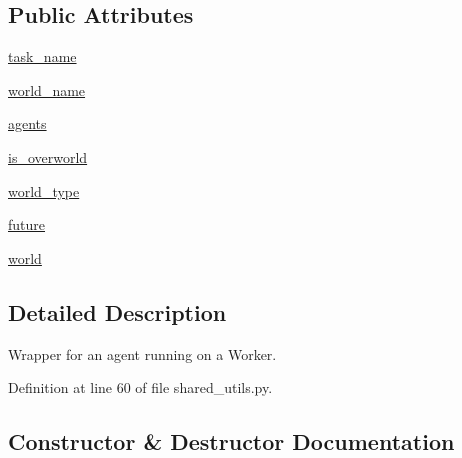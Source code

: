 \subsection*{Public Attributes}
\begin{DoxyCompactItemize}
\item 
\hyperlink{classparlai_1_1chat__service_1_1services_1_1messenger_1_1shared__utils_1_1TaskState_a34a947c51b78f84f79de8e87d8e1cf5b}{task\+\_\+name}
\item 
\hyperlink{classparlai_1_1chat__service_1_1services_1_1messenger_1_1shared__utils_1_1TaskState_a83fab38feda407c392bd8ea32eb19607}{world\+\_\+name}
\item 
\hyperlink{classparlai_1_1chat__service_1_1services_1_1messenger_1_1shared__utils_1_1TaskState_a2e39f33ab663bb7345223e90f0dd530d}{agents}
\item 
\hyperlink{classparlai_1_1chat__service_1_1services_1_1messenger_1_1shared__utils_1_1TaskState_ad19ea555a240eec41329931887b93475}{is\+\_\+overworld}
\item 
\hyperlink{classparlai_1_1chat__service_1_1services_1_1messenger_1_1shared__utils_1_1TaskState_a10ad5170d1a6686bed914cb5b070fc6c}{world\+\_\+type}
\item 
\hyperlink{classparlai_1_1chat__service_1_1services_1_1messenger_1_1shared__utils_1_1TaskState_aace1bab47cfac9b108e1f285727b8996}{future}
\item 
\hyperlink{classparlai_1_1chat__service_1_1services_1_1messenger_1_1shared__utils_1_1TaskState_a236456f6ad3f79512dbd7e6084a44e37}{world}
\end{DoxyCompactItemize}


\subsection{Detailed Description}
\begin{DoxyVerb}Wrapper for an agent running on a Worker.
\end{DoxyVerb}
 

Definition at line 60 of file shared\+\_\+utils.\+py.



\subsection{Constructor \& Destructor Documentation}
\mbox{\label{classparlai_1_1chat__service_1_1services_1_1messenger_1_1shared__utils_1_1TaskState_af134b6fb0f8a86f34b3c3d2c17d18dc1}} 
